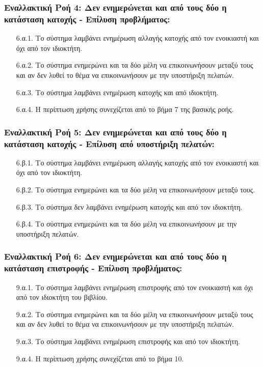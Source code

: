 \documentclass[12pt,a4paper]{article}
\begin{document}
\subsubsection*{Εναλλακτική Ροή 4: Δεν ενημερώνεται και από τους δύο η κατάσταση κατοχής - Επίλυση προβλήματος:}
\begin{enumerate}
    \item[6.α.1.] Το σύστημα λαμβάνει ενημέρωση αλλαγής κατοχής από τον ενοικιαστή και όχι από τον ιδιοκτήτη.
    \item[6.α.2.] Το σύστημα ενημερώνει και τα δύο μέλη να επικοινωνήσουν μεταξύ τους και αν δεν λυθεί το θέμα να επικοινωνήσουν με την υποστήριξη πελατών.
    \item[6.α.3.] Το σύστημα λαμβάνει ενημέρωση κατοχής και από ιδιοκτήτη.
    \item[6.α.4.] Η περίπτωση χρήσης συνεχίζεται από το βήμα 7 της βασικής ροής.
\end{enumerate}

\subsubsection*{Εναλλακτική Ροή 5: Δεν ενημερώνεται και από τους δύο η κατάσταση κατοχής - Επίλυση από υποστήριξη πελατών:}
\begin{enumerate}
    \item[6.β.1.] Το σύστημα λαμβάνει ενημέρωση αλλαγής κατοχής από τον ενοικιαστή και όχι από τον ιδιοκτήτη.
    \item[6.β.2.] Το σύστημα ενημερώνει και τα δύο μέλη να επικοινωνήσουν μεταξύ τους.
    \item[6.β.3.] Το σύστημα δεν λαμβάνει ενημέρωση κατοχής και από τον ιδιοκτήτη.
    \item[6.β.4.] Το σύστημα ενημερώνει και τα δύο μέλη να επικοινωνήσουν με την υποστήριξη πελατών.
\end{enumerate}

\subsubsection*{Εναλλακτική Ροή 6: Δεν ενημερώνεται και από τους δύο η κατάσταση επιστροφής - Επίλυση προβλήματος:}
\begin{enumerate}
    \item[9.α.1.] Το σύστημα λαμβάνει ενημέρωση επιστροφής από τον ενοικιαστή και όχι από τον ιδιοκτήτη του βιβλίου.
    \item[9.α.2.] Το σύστημα ενημερώνει και τα δύο μέλη να επικοινωνήσουν μεταξύ τους και αν δεν λυθεί το θέμα να επικοινωνήσουν με την υποστήριξη πελατών.
    \item[9.α.3.] Το σύστημα λαμβάνει ενημέρωση επιστροφής και από τον ιδιοκτήτη.
    \item[9.α.4.] Η περίπτωση χρήσης συνεχίζεται από το βήμα 10.
\end{enumerate}
\end{document}
